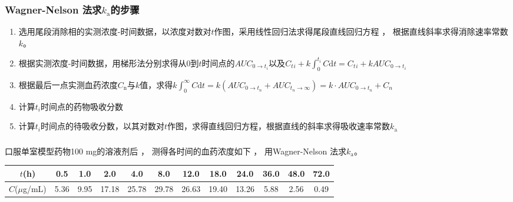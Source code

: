 \documentclass[dvipsnames, svgnames, x11names]{beamer}
\begin{document}
\begin{frame}
    \frametitle{Wagner-Nelson 法求$k_\mathrm{a}$的步骤}
    \begin{enumerate}
      \item 选用尾段消除相的实测浓度-时间数据，以浓度对数对$t$作图，采用线性回归法求得尾段直线回归方程 ， 根据直线斜率求得消除速率常数$k$。
      \item 根据实测浓度-时间数据，用梯形法分别求得从0到$t$时间点的$AUC_{0\to t_i}$以及$C{_t{_i}}+k\int_{0}^{t_i}C\mathrm{d}t=C_t{_i}+kAUC_{0\to t_i}$
      \item 根据最后一点实测血药浓度$C_\mathrm{n}$与$k$值，求得$k\int_{0}^{\infty}C\mathrm{d}t=k(AUC_{0\to t_n}+AUC_{t_n\to\infty})=k\cdot AUC_{0\to t_n}+C_n$
      \item 计算$t{_i}$时间点的药物吸收分数
      \item 计算$t{_i}$时间点的待吸收分数，以其对数对$t$作图，求得直线回归方程，根据直线的斜率求得吸收速率常数$k_\mathrm{a}$
    \end{enumerate}
\end{frame}


\begin{frame}[t]
    \frametitle{}
    \begin{example}
        口服单室模型药物100 mg的溶液剂后 ， 测得各时间的血药浓度如下 ， 用Wagner-Nelson 法求$k_\mathrm{a}$。
        \begin{table}
            \centering
            \small
            \begin{tabular}{cccccccccccc}
                \bottomrule
                $t$(h) & 0.5 & 1.0 & 2.0 & 4.0 & 8.0 & 12.0 & 18.0 & 24.0 & 36.0 & 48.0 & 72.0 \hspace{-9pt} \\ \hline
                $C$($\mu$g/mL) & 5.36 & 9.95 & 17.18 & 25.78 & 29.78 & 26.63 & 19.40 & 13.26 & 5.88 & 2.56 & 0.49 \hspace{-9pt} \\ \toprule 
            \end{tabular}
        \end{table}
    \end{example}
\end{frame}
\end{document}
